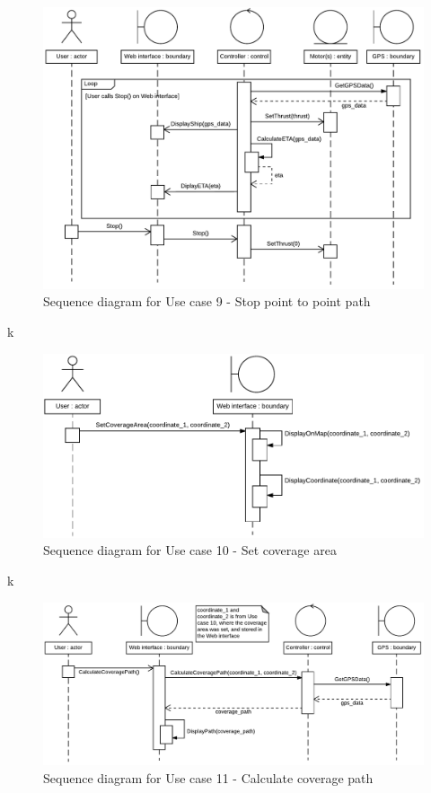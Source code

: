 \begin{figure}[H]
	\centering
	\includegraphics[width=1\linewidth]{Images/System_architecture/Use_case_9_SD}
	\caption{Sequence diagram for Use case 9 - Stop point to point path}
\end{figure}

k

\begin{figure}[H]
	\centering
	\includegraphics[width=1\linewidth]{Images/System_architecture/Use_case_10_SD}
	\caption{Sequence diagram for Use case 10 - Set coverage area}
\end{figure}

k

\begin{figure}[H]
	\centering
	\includegraphics[width=1\linewidth]{Images/System_architecture/Use_case_11_SD}
	\caption{Sequence diagram for Use case 11 - Calculate coverage path}
\end{figure}

